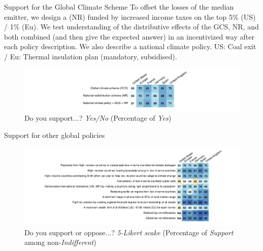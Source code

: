 \begin{framefont}{\small}
\begin{frame}{Support for the Global Climate Scheme\label{}}
\bbvs \ip To offset the losses of the median emitter, we design a  (NR) funded by increased income taxes on the top 5\% (US) / 1\% (Eu).
\ip We test understanding of the distributive effects of the GCS, NR, and both combined (and then give the expected answer) in an incentivized way after each policy description.%
\ip We also describe a national climate policy. US: Coal exit / Eu: Thermal insulation plan (mandatory, subsidised).
\ee
    \begin{figure}
        \centering %
        \caption{Do you support...? \textit{Yes/No} (Percentage of \textit{Yes})}
        \includegraphics[height=.45\textheight]{../figures/country_comparison/support_binary_positive.pdf} 
    \end{figure}
\end{frame}

\begin{frame}{Support for other global policies\label{}}
	\vspace{-.3cm}
    \begin{figure}
        \centering 
        \caption{Do you support or oppose...? \textit{5-Likert scake} (Percentage of \textit{Support} among non-\textit{Indifferent})}
        \vspace{-.2cm}
        \includegraphics[height=.9\textheight]{../figures/country_comparison/support_likert_share.pdf} 
    \end{figure}
\end{frame}


\end{framefont}
